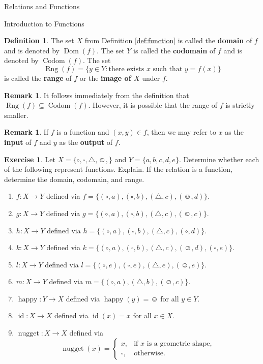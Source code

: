 \documentclass[11pt]{article}
\newcommand{\dom}{\operatorname{Dom}}
\newcommand{\codom}{\operatorname{Codom}}
\newcommand{\range}{\operatorname{Rng}}
\theoremstyle{definition}
\newtheorem{definition}[theorem]{Definition}
\newtheorem{exercise}[theorem]{Exercise}
\newtheorem{remark}[theorem]{Remark}
\begin{document}
\begin{section}{Relations and Functions}
\begin{subsection}{Introduction to Functions}
\begin{definition}
The set $X$ from Definition \ref{def:function} is called the \textbf{domain} of $f$ and is denoted by $\dom(f)$.  The set $Y$ is called the \textbf{codomain} of $f$ and is denoted by $\codom(f)$.  The set
\[
\range(f)=\{y\in Y: \mbox{there exists }x\mbox{ such that } y=f(x)\}
\]
is called the \textbf{range} of $f$ or the \textbf{image of $X$} under $f$.
\end{definition}

\begin{remark}
It follows immediately from the definition that $\range(f)\subseteq \codom(f)$.  However, it is possible that the range of $f$ is strictly smaller.
\end{remark}

\begin{remark}
If $f$ is a function and $(x,y)\in f$, then we may refer to $x$ as the \textbf{input} of $f$ and $y$ as the \textbf{output} of $f$.
\end{remark}

\begin{exercise}\label{exer:lots}
Let $X=\{\circ, \square,\triangle,\smiley,\}$ and $Y=\{a,b,c,d,e\}$.  Determine whether each of the following represent functions.  Explain.  If the relation is a function, determine the domain, codomain, and range.

\begin{enumerate}
\item $f:X\to Y$ defined via $f=\{(\circ, a),(\square,b),(\triangle,c),(\smiley,d)\}$.
\item $g:X\to Y$ defined via $g=\{(\circ, a),(\square,b),(\triangle,c),(\smiley,c)\}$.
\item $h:X\to Y$ defined via $h=\{(\circ, a),(\square,b),(\triangle,c),(\circ,d)\}$.
\item $k:X\to Y$ defined via $k=\{(\circ, a),(\square,b),(\triangle,c),(\smiley,d),(\square,e)\}$.
\item $l:X\to Y$ defined via $l=\{(\circ, e),(\square,e),(\triangle,e),(\smiley,e)\}$.
\item $m:X\to Y$ defined via $m=\{(\circ, a),(\triangle,b),(\smiley,c)\}$.
\item $\operatorname{happy}:Y\to X$ defined via $\operatorname{happy}(y)=\smiley$ for all $y\in Y$.
\item $\operatorname{id}:X\to X$ defined via $\operatorname{id}(x)=x$ for all $x\in X$.
\item $\operatorname{nugget}:X\to X$ defined via 
\[
\operatorname{nugget}(x)=\begin{cases}
x, & \mbox{if } x\mbox{ is a geometric shape},\\
\square, & \mbox{otherwise}.
\end{cases}
\]
\end{enumerate}
\end{exercise}


\end{subsection}
\end{section}
\end{document}
